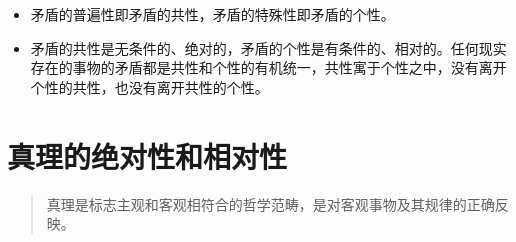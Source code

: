 \documentclass[
]{article}
\begin{document}
\begin{itemize}
\begin{itemize}
    \begin{itemize}
    \item
      矛盾的普遍性即矛盾的共性，矛盾的特殊性即矛盾的个性。
    \item
      矛盾的共性是无条件的、绝对的，矛盾的个性是有条件的、相对的。任何现实存在的事物的矛盾都是共性和个性的有机统一，共性寓于个性之中，没有离开个性的共性，也没有离开共性的个性。
    \end{itemize}
  \end{itemize}
\end{itemize}

\hypertarget{ux771fux7406ux7684ux7eddux5bf9ux6027ux548cux76f8ux5bf9ux6027}{%
\section{真理的绝对性和相对性}\label{ux771fux7406ux7684ux7eddux5bf9ux6027ux548cux76f8ux5bf9ux6027}}

\begin{quote}
真理是标志主观和客观相符合的哲学范畴，是对客观事物及其规律的正确反映。
\end{quote}
\end{document}
